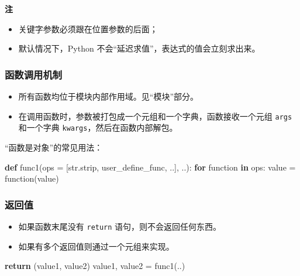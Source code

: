 \documentclass[]{article}
\newenvironment{Shaded}{}{}
\newcommand{\KeywordTok}[1]{\textcolor[rgb]{0.00,0.44,0.13}{\textbf{#1}}}
\newcommand{\ControlFlowTok}[1]{\textcolor[rgb]{0.00,0.44,0.13}{\textbf{#1}}}
\newcommand{\OperatorTok}[1]{\textcolor[rgb]{0.40,0.40,0.40}{#1}}
\newcommand{\BuiltInTok}[1]{#1}
\newcommand{\NormalTok}[1]{#1}
\begin{document}
\textbf{注}

\begin{itemize}
\item
  关键字参数必须跟在位置参数的后面；
\item
  默认情况下，Python 不会``延迟求值''，表达式的值会立刻求出来。
\end{itemize}

\subsubsection{函数调用机制}\label{header-n234}

\begin{itemize}
\item
  所有函数均位于模块内部作用域。见``模块''部分。
\item
  在调用函数时，参数被打包成一个元组和一个字典，函数接收一个元组
  \texttt{args} 和一个字典 \texttt{kwargs}，然后在函数内部解包。
\end{itemize}

``函数是对象''的常见用法：

\begin{Shaded}
\begin{Highlighting}[]
\KeywordTok{def}\NormalTok{ func1(ops }\OperatorTok{=}\NormalTok{ [}\BuiltInTok{str}\NormalTok{.strip, user_define_func, ..], ..):}
  \ControlFlowTok{for}\NormalTok{ function }\KeywordTok{in}\NormalTok{ ops:}
\NormalTok{    value }\OperatorTok{=}\NormalTok{ function(value)}
\end{Highlighting}
\end{Shaded}

\subsubsection{返回值}\label{header-n245}

\begin{itemize}
\item
  如果函数末尾没有 \texttt{return} 语句，则不会返回任何东西。
\item
  如果有多个返回值则通过一个元组来实现。
\end{itemize}

\begin{Shaded}
\begin{Highlighting}[]
\ControlFlowTok{return}\NormalTok{ (value1, value2)}
\NormalTok{value1, value2 }\OperatorTok{=}\NormalTok{ func1(..)}
\end{Highlighting}
\end{Shaded}
\end{document}
